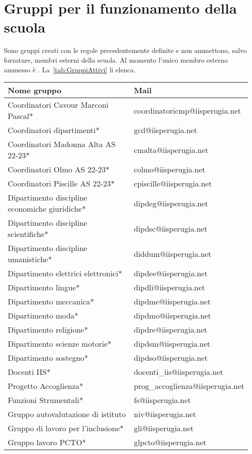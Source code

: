 \section{Gruppi per il funzionamento della scuola }
Sono gruppi creati con le regole precedentemente definite e non ammettono, salvo forzature, membri esterni della scuola. Al momento l'unico membro esterno ammesso è . La~\cref{tab:GruppiAttivi} li elenca.
\begin{table}
	\centering
	\begin{tabular}{ll}
		\toprule
Nome gruppo&Mail\\
\midrule
Coordinatori Cavour Marconi Pascal*&
coordinatoricmp@iisperugia.net  \\
Coordinatori dipartimenti*&
gcd@iisperugia.net\\
Coordinatori Madonna Alta AS 22-23*&
cmalta@iisperugia.net\\
Coordinatori Olmo AS 22-23*&
colmo@iisperugia.net\\
Coordinatori Piscille AS 22-23*&
cpiscille@iisperugia.net\\
Dipartimento discipline economiche giuridiche*&
dipdeg@iisperugia.net\\
Dipartimento discipline scientifiche*&
dipdsc@iisperugia.net\\
Dipartimento discipline umanistiche*&
diddum@iisperugia.net\\
Dipartimento elettrici elettronici*&
dipdee@iisperugia.net\\
Dipartimento lingue*&
dipdli@iisperugia.net\\
Dipartimento meccanica*&
dipdme@iisperugia.net\\
Dipartimento moda*&
dipdmo@iisperugia.net\\
Dipartimento religione*&
dipdre@iisperugia.net\\
Dipartimento scienze motorie*&
dipdsm@iisperugia.net\\
Dipartimento sostegno*&
dipdso@iisperugia.net\\
Docenti IIS*&
docenti\_iis@iisperugia.net\\
Progetto Accoglienza*&prog\_accoglienza@iisperugia.net\\
Funzioni Strumentali*&
fs@iisperugia.net\\
Gruppo autovalutazione di istituto&
niv@iisperugia.net\\
Gruppo di lavoro per l'inclusione*&
gli@iisperugia.net\\
Gruppo lavoro PCTO*&
glpcto@iisperugia.net\\

\end{tabular}
\end{table}
